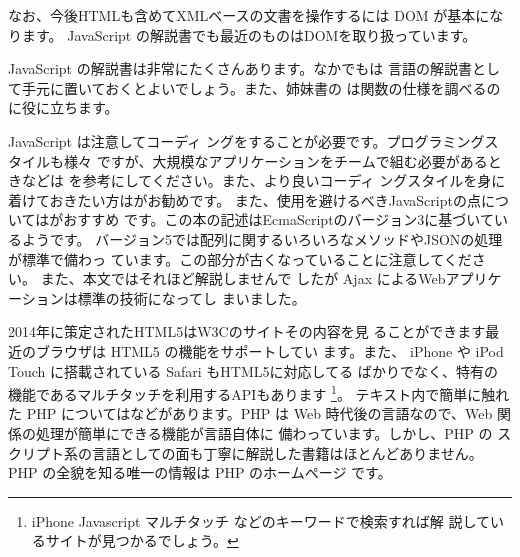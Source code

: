 なお、今後HTMLも含めてXMLベースの文書を操作するには DOM が基本になります。
JavaScript の解説書でも最近のものはDOMを取り扱っています。

JavaScript の解説書は非常にたくさんあります。なかでも\cite{JavaScript}は
言語の解説書として手元に置いておくとよいでしょう。また、姉妹書の
\cite{JavaScriptRef} は関数の仕様を調べるのに役に立ちます。

JavaScript は注意してコーディ
ングをすることが必要です。プログラミングスタイルも様々
ですが、大規模なアプリケーションをチームで組む必要があるときなどは
\cite{JavaScriptMentenable}を参考にしてください。また、より良いコーディ
ングスタイルを身に着けておきたい方は\cite{JavaScript68}がお勧めです。
また、使用を避けるべきJavaScriptの点については\cite{Crockford}がおすすめ
です。この本の記述はEcmaScriptのバージョン3に基づいているようです。
\ifSeminor
\else
バージョン5では配列に関するいろいろなメソッドやJSONの処理が標準で備わっ
ています。この部分が古くなっていることに注意してください。
\fi
\ifSeminor
\else
また、本文ではそれほど解説しませんで
したが Ajax によるWebアプリケーションは標準の技術になってし
まいました。
\fi
\ifSeminor
\else

2014年に策定されたHTML5はW3Cのサイト\cite{HTML5}その内容を見
ることができます最近のブラウザは HTML5 の機能をサポートしてい
ます。また、
iPhone や iPod Touch に搭載されている Safari もHTML5に対応してる
ばかりでなく、特有の機能であるマルチタッチを利用するAPIもあります
\footnote{iPhone Javascript マルチタッチ などのキーワードで検索すれば解
説しているサイトが見つかるでしょう。}。
\fi
\fi
\ifSeminor
\else
テキスト内で簡単に触れた PHP については\cite{learningphp,ProgPHP}などがあります。PHP
 は Web 時代後の言語なので、Web 関係の処理が簡単にできる機能が言語自体に
 備わっています。しかし、PHP の%
 スクリプト系の言語としての面も丁寧に解説した書籍はほとんどありません。PHP
 の全貌を知る唯一の情報は PHP のホームページ\cite{PHPHome} です。
 \fi

